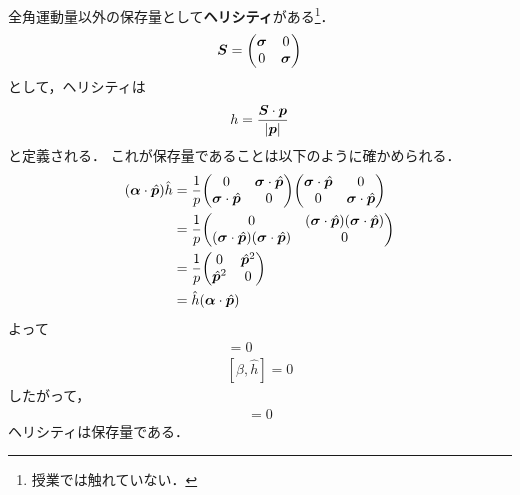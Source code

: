 \documentclass{report}
\begin{document}
  全角運動量以外の保存量として\textbf{ヘリシティ}がある\footnote{授業では触れていない．}．
  \begin{align}
    \bm{\bm{S}} = 
    \mqty(
      \bm{\sigma} & 0\\
      0 & \bm{\sigma}
    )
  \end{align}
  として，ヘリシティは
  \begin{align}
    h = \frac{\bm{\bm{S}} \cdot \bm{p}}{\abs{\bm{p}}}
  \end{align}
  と定義される．
  これが保存量であることは以下のように確かめられる．
  \begin{align}
    (\bm{\alpha} \cdot \hat{\bm{p}}) \hat{h} &= \frac{1}{p}
    \mqty(
      0 & \bm{\sigma} \cdot \hat{\bm{p}}\\
      \bm{\sigma} \cdot \hat{\bm{p}} & 0
    )
    \mqty(
      \bm{\sigma} \cdot \hat{\bm{p}} & 0\\
      0 & \bm{\sigma} \cdot \hat{\bm{p}}
    )\\
    &= \frac{1}{p}
    \mqty(
      0 & (\bm{\sigma} \cdot \hat{\bm{p}})(\bm{\sigma} \cdot \hat{\bm{p}})\\
      (\bm{\sigma} \cdot \hat{\bm{p}})(\bm{\sigma} \cdot \hat{\bm{p}}) & 0
    )\\
    &=\frac{1}{p}
    \mqty(
      0 & \hat{\bm{p}}^2\\
      \hat{\bm{p}}^2 & 0
    )\\
    &= \hat{h}(\bm{\alpha}\cdot \hat{\bm{p}})
  \end{align}
  よって
  \begin{align}
    [\bm{\alpha} \cdot \hat{\bm{p}}, \hat{h}] = 0\\
    [\beta, \hat{h}] = 0
  \end{align}
  したがって，
  \begin{align}
    [\hat{H}, \hat{h}] = 0
  \end{align}
  ヘリシティは保存量である．
\end{document}
